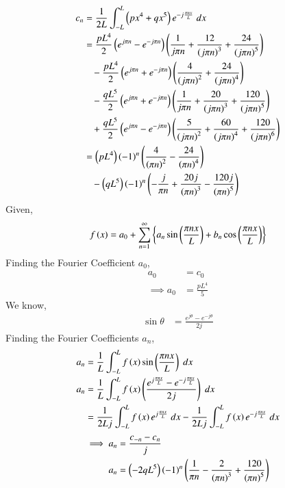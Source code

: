 \documentclass[journal,12pt,twocolumn]{IEEEtran}
\theoremstyle{remark}
\begin{document}
\begin{align}
    c_n&=\frac{1}{2L}\int_{-L}^{L}\left(px^4+qx^5\right)e^{-j\frac{\pi n x}{L}}\;dx\label{eq:CE-25.1}\\
    &=\frac{pL^4}{2}\left(e^{j\pi n}-e^{-j\pi n}\right)\left(\frac{1}{j\pi n}+\frac{12}{\left(j\pi n\right)^3}+\frac{24}{\left(j\pi n\right)^5}\right)\notag\\
    &\;\;\;-\frac{pL^4}{2}\left(e^{j\pi n}+e^{-j\pi n}\right)\left(\frac{4}{\left(j\pi n\right)^2}+\frac{24}{\left(j\pi n\right)^4}\right)\notag\\
    &\;\;\;-\frac{qL^5}{2}\left(e^{j\pi n}+e^{-j\pi n}\right)\left(\frac{1}{j\pi n}+\frac{20}{\left(j\pi n\right)^3}+\frac{120}{\left(j\pi n\right)^5}\right)\notag\\
    &\;\;\;+\frac{qL^5}{2}\left(e^{j\pi n}-e^{-j\pi n}\right)\left(\frac{5}{\left(j\pi n\right)^2}+\frac{60}{\left(j\pi n\right)^4}+\frac{120}{\left(j\pi n\right)^6}\right)\\
    &=\left(pL^4\right)\left(-1\right)^n\left(\frac{4}{\left(\pi n\right)^2}-\frac{24}{\left(\pi n\right)^4}\right)\notag\\
    &\;\;\;-\left(qL^5\right)\left(-1\right)^n\left(-\frac{j}{{\pi n}}+\frac{20j}{\left(\pi n\right)^3}-\frac{120j}{\left(\pi n\right)^5}\right)
\end{align}
Given,
\begin{align}
    f\left(x\right)=a_0+\sum_{n=1}^{\infty}\left\{a_n\sin\left(\frac{\pi n x}{L}\right)+b_n\cos\left(\frac{\pi n x}{L}\right)\right\}
\end{align}
Finding the Fourier Coefficient $a_0$,
\begin{align}
    a_0&=c_0\\
    \implies a_0&=\frac{pL^4}{5}
\end{align}
We know,
\begin{align}
    \sin \theta&=\frac{e^{j\theta}-e^{-j\theta}}{2j}
\end{align}
Finding the Fourier Coefficients $a_n$,
\begin{align}
    a_n&=\frac{1}{L}\int_{-L}^{L}f\left(x\right)\sin\left(\frac{\pi nx}{L}\right)\;dx\\
    a_n&=\frac{1}{L}\int_{-L}^{L}f\left(x\right)\left(\frac{e^{j\frac{\pi n x}{L}}-e^{-j\frac{\pi n x}{L}}}{2j}\right)\;dx\\
    &=\frac{1}{2Lj}\int_{-L}^{L}f\left(x\right)e^{j\frac{\pi n x}{L}}\;dx-\frac{1}{2Lj}\int_{-L}^{L}f\left(x\right)e^{-j\frac{\pi n x}{L}}\;dx
\end{align}
\begin{align}
    \implies a_n&=\frac{c_{-n}-c_n}{j}\\
    a_n&=\left(-2qL^5\right)\left(-1\right)^{n}\left(\frac{1}{\pi n}-\frac{2}{\left(\pi n\right)^3}+\frac{120}{\left(\pi n\right)^5}\right)
\end{align}
\end{document}
